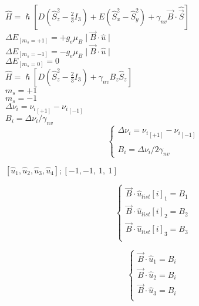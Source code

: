 \documentclass{report}
\begin{document}
     $\hat{H} = \hslash [ D (\hat{S}_z^2 - \frac{2}{3} I_3) + E (\hat{S}_x^2 - \hat{S}_y^2) + \gamma_{nv} \vec{B} \cdot \hat{\vec{S}} ]$\\
     $\Delta E_{[m_s = +1]} = + g_e \mu_B \mid \vec{B} \cdot \hat{u} \mid$ \\
     $\Delta E_{[m_s = -1]} = - g_e \mu_B \mid\vec{B} \cdot \hat{u} \mid$ \\
     $\Delta E_{[m_s = 0]} = 0$ \\
     $\hat{H} = \hslash [ D (\hat{S}_z^2 - \frac{2}{3} I_3) + \gamma_{nv} B_z \hat{S}_z ]$\\
     $m_s = +1$ \\
     $m_s = -1$ \\
     $\Delta \nu_i = {\nu_i}_{[+1]} - {\nu_i}_{[-1]} $ \\
     $B_i = \Delta \nu_i / \gamma_{nv} $ \\
     \begin{equation}
      \begin{cases}
        \Delta \nu_i = {\nu_i}_{[+1]} - {\nu_i}_{[-1]} \\ \\
        B_i = \Delta \nu_i / 2 \gamma_{nv} 
      \end{cases}  
     \end{equation}
      
    $[\hat{u}_1,\hat{u}_2,\hat{u}_3,\hat{u}_4];[-1,-1, \ 1, \ 1]$

     \begin{equation}
      \begin{cases}
        \vec{B} \cdot \hat{u}_{list}[i]_1 = B_1 \\
        \vec{B} \cdot \hat{u}_{list}[i]_2 = B_2 \\
        \vec{B} \cdot \hat{u}_{list}[i]_3 = B_3 \\
      \end{cases}  
     \end{equation}

     \begin{equation}
      \begin{cases}
        \vec{B} \cdot \hat{u}_1 = B_i \\
        \vec{B} \cdot \hat{u}_2 = B_i \\
        \vec{B} \cdot \hat{u}_3 = B_i \\
      \end{cases}  
     \end{equation}
\end{document}
